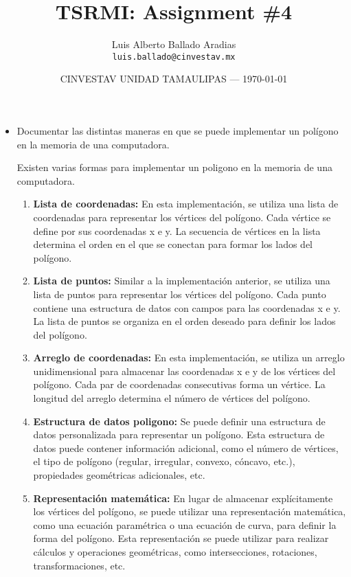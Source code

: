 \documentclass{article}
\title{TSRMI: Assignment \#4} %
\author{Luis Alberto Ballado Aradias\\ \texttt{luis.ballado@cinvestav.mx}} %
\date{CINVESTAV UNIDAD TAMAULIPAS --- \today} %
\begin{document}
\maketitle %


\begin{itemize}
\item Documentar las distintas maneras en que se puede implementar un polígono en la memoria de una computadora.

  Existen varias formas para implementar un poligono en la memoria de una computadora.\\

  \begin{enumerate}
  \item \textbf{Lista de coordenadas:} En esta implementación, se utiliza una lista de coordenadas para representar los vértices del polígono. Cada vértice se define por sus coordenadas x e y. La secuencia de vértices en la lista determina el orden en el que se conectan para formar los lados del polígono.
  \item \textbf{Lista de puntos:} Similar a la implementación anterior, se utiliza una lista de puntos para representar los vértices del polígono. Cada punto contiene una estructura de datos con campos para las coordenadas x e y. La lista de puntos se organiza en el orden deseado para definir los lados del polígono.
  \item \textbf{Arreglo de coordenadas:} En esta implementación, se utiliza un arreglo unidimensional para almacenar las coordenadas x e y de los vértices del polígono. Cada par de coordenadas consecutivas forma un vértice. La longitud del arreglo determina el número de vértices del polígono.
  \item \textbf{Estructura de datos poligono:} Se puede definir una estructura de datos personalizada para representar un polígono. Esta estructura de datos puede contener información adicional, como el número de vértices, el tipo de polígono (regular, irregular, convexo, cóncavo, etc.), propiedades geométricas adicionales, etc.
  \item \textbf{Representación matemática:} En lugar de almacenar explícitamente los vértices del polígono, se puede utilizar una representación matemática, como una ecuación paramétrica o una ecuación de curva, para definir la forma del polígono. Esta representación se puede utilizar para realizar cálculos y operaciones geométricas, como intersecciones, rotaciones, transformaciones, etc. 
  \end{enumerate}


\end{itemize}
\end{document}
